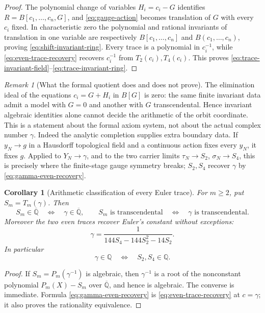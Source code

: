 \documentclass[11pt]{article}
\theoremstyle{keio}
\newtheorem{corollary}[theorem]{Corollary}
\theoremstyle{definition}
\theoremstyle{remark}
\newtheorem{remark}[theorem]{Remark}
\newcommand{\Q}{\mathbb Q}
\newcommand{\Qbar}{\overline{\mathbb Q}}
\begin{document}
\begin{proof}
The polynomial change of variables \(H_i=c_i-G\) identifies
\(R=B[c_1,\ldots,c_n,G]\), and \eqref{eq:gauge-action} becomes translation
of \(G\) with every \(c_i\) fixed.  In characteristic zero the polynomial
and rational invariants of translation in one variable are respectively
\(B[c_1,\ldots,c_n]\) and \(B(c_1,\ldots,c_n)\), proving
\eqref{eq:shift-invariant-ring}.  Every trace is a polynomial in
\(c_i^{-1}\), while \eqref{eq:even-trace-recovery} recovers \(c_i^{-1}\)
from \(T_2(c_i),T_4(c_i)\).  This proves
\eqref{eq:trace-invariant-field}--\eqref{eq:trace-invariant-ring}.
\end{proof}

\begin{remark}[What the formal quotient does and does not prove]
The elimination ideal of the equations \(c_i=G+H_i\) in \(B[G]\) is zero:
the same finite invariant data admit a model with \(G=0\) and another with
\(G\) transcendental.  Hence invariant algebraic identities alone cannot
decide the arithmetic of the orbit coordinate.  This is a statement about
the formal axiom system, not about the actual complex number \(\gamma\).
Indeed the analytic completion supplies extra boundary data.  If
\(y_N\to g\) in a Hausdorff topological field and a continuous action fixes
every \(y_N\), it fixes \(g\).  Applied to \(Y_N\to\gamma\), and to the two
carrier limits \(\tau_N\to S_2\), \(\sigma_N\to S_4\), this is precisely
where the finite-stage gauge symmetry breaks; \(S_2,S_4\) recover
\(\gamma\) by \eqref{eq:gamma-even-recovery}.
\end{remark}

\begin{corollary}[Arithmetic classification of every Euler trace]
\label{cor:Euler-trace-arithmetic}
For \(m\ge2\), put \(S_m=T_m(\gamma)\).  Then
\[
 S_m\in\Qbar\quad\Longleftrightarrow\quad\gamma\in\Qbar,
 \qquad
 S_m\text{ is transcendental}
 \quad\Longleftrightarrow\quad\gamma\text{ is transcendental}.
\]
Moreover the two even traces recover Euler's constant without exceptions:
\begin{equation}\label{eq:gamma-even-recovery}
 \boxed{\displaystyle
 \gamma=\frac1{144S_4-144S_2^2-14S_2}.}
\end{equation}
In particular
\[
 \gamma\in\Q\quad\Longleftrightarrow\quad S_2,S_4\in\Q.
\]
\end{corollary}

\begin{proof}
If \(S_m=P_m(\gamma^{-1})\) is algebraic, then \(\gamma^{-1}\) is a root
of the nonconstant polynomial \(P_m(X)-S_m\) over \(\Qbar\), and hence is
algebraic.  The converse is immediate.  Formula
\eqref{eq:gamma-even-recovery} is \eqref{eq:even-trace-recovery} at
\(c=\gamma\); it also proves the rationality equivalence.
\end{proof}
\end{document}
